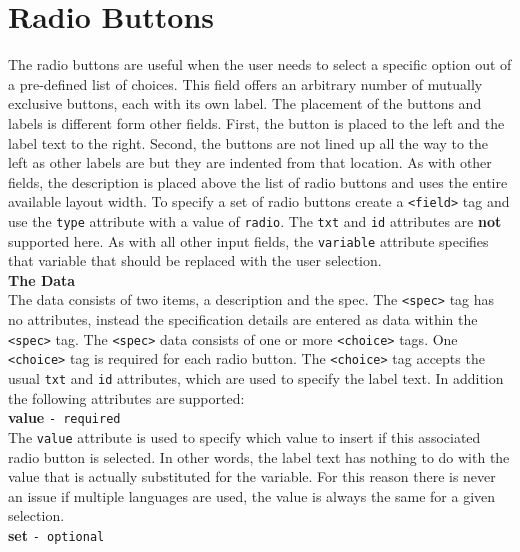 \section{Radio Buttons}

The radio buttons are useful when the user needs to select a specific
option out of a pre-defined list of choices. This field offers an
arbitrary number of mutually exclusive buttons, each with its own label.
The placement of the buttons and labels is different form other fields.
First, the button is placed to the left and the label text to the right.
Second, the buttons are not lined up all the way to the left as other
labels are but they are indented from that location. As with other
fields, the description is placed above the list of radio buttons and
uses the entire available layout width. To specify a set of radio
buttons create a \texttt{<field>} tag and use the \texttt{type}
attribute with a value of \texttt{radio}. The \texttt{txt} and
\texttt{id} attributes are \textbf{not} supported here. As with all
other input fields, the \texttt{variable} attribute specifies that
variable that should be replaced with the user selection.\\

\textbf{The Data}\\

The data consists of two items, a description and the spec. The
\texttt{<spec>} tag has no attributes, instead the specification details
are entered as data within the \texttt{<spec>} tag. The \texttt{<spec>}
data consists of one or more \texttt{<choice>} tags. One
\texttt{<choice>} tag is required for each radio button. The
\texttt{<choice>} tag accepts the usual \texttt{txt} and \texttt{id}
attributes, which are used to specify the label text. In addition the
following attributes are supported:\\

\textbf{value} \texttt{- required}\\

The \texttt{value} attribute is used to specify which value to insert if
this associated radio button is selected. In other words, the label text
has nothing to do with the value that is actually substituted for the
variable. For this reason there is never an issue if multiple languages
are used, the value is always the same for a given selection.\\

\textbf{set} \texttt{- optional}\\

